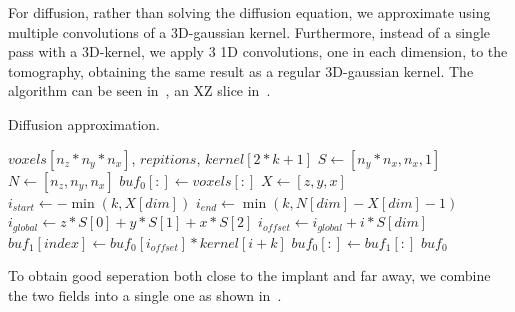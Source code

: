 For diffusion, rather than solving the diffusion equation, we approximate using multiple convolutions of a 3D-gaussian kernel.
Furthermore, instead of a single pass with a 3D-kernel, we apply 3 1D convolutions, one in each dimension, to the tomography, obtaining the same result as a regular 3D-gaussian kernel.
The algorithm can be seen in~, an XZ slice in~.

\begin{algorithm}
    \caption{Diffusion approximation.}
    \label{alg:diffusion}
    \begin{algorithmic}
         {$voxels[n_z*n_y*n_x]$, $repitions$, \newline \indent \indent $kernel[2*k+1]$}
            \State $S \gets [n_y * n_x, n_x, 1]$
            \State $N \gets [n_z, n_y, n_x]$
            \State $buf_0[:] \gets voxels[:]$
                        \State $X \gets [z,y,x]$
                        \State $i_{start} \gets - \min (k, X[dim])$
                        \State $i_{end} \gets \min (k, N[dim] - X[dim] - 1)$
                        \State $i_{global} \gets z*S[0] + y*S[1] + x*S[2]$
                            \State $i_{offset} \gets i_{global} + i*S[dim]$
                            \State $buf_1[index] \gets buf_0[i_{offset}] * kernel[i+k]$
                        \EndFor
                    \EndFor
                    \State $buf_0[:] \gets buf_1[:]$
                \EndFor
            \EndFor
            \Return $buf_0$
        \EndFunction
    \end{algorithmic}
\end{algorithm}

To obtain good seperation both close to the implant and far away, we combine the two fields into a single one as shown in~.

%

